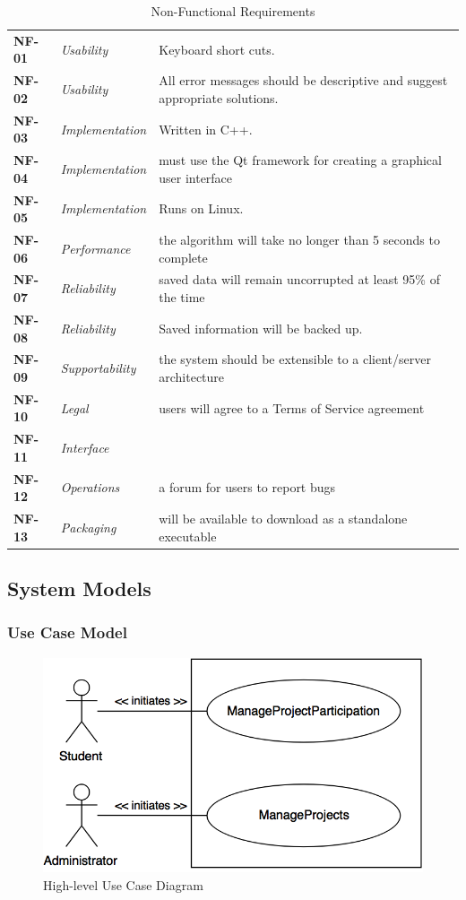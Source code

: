 \documentclass[12pt,letterpaper]{article}
\begin{document}
\begin{table}[H]
	\caption{Non-Functional Requirements}
	\begin{tabu} to 
		NF-01 & Usability & Keyboard short cuts. \\
		NF-02 & Usability & All error messages should be descriptive and suggest appropriate solutions.\\
		NF-03 & Implementation & Written in C++. \\
		NF-04 & Implementation & must use the Qt framework for creating a graphical user interface \\
		NF-05 & Implementation & Runs on Linux. \\
		NF-06 & Performance & the algorithm will take no longer than 5 seconds to complete \\
		NF-07 & Reliability & saved data will remain uncorrupted at least 95\% of the time \\
		NF-08 & Reliability & Saved information will be backed up. \\
		NF-09 & Supportability & the system should be extensible to a client/server architecture \\
		NF-10 & Legal & users will agree to a Terms of Service agreement \\
		NF-11 & Interface & \\
		NF-12 & Operations & a forum for users to report bugs \\
		NF-13 & Packaging & will be available to download as a standalone executable \\
	\end{tabu}
\end{table}

\subsection{System Models}

\subsubsection{Use Case Model}

\begin{figure}[H]
	\centering{}
	\includegraphics[scale=0.4]{imgs/high-level-use-case-diagram.png}
	\caption{High-level Use Case Diagram}
\end{figure}
\end{document}
